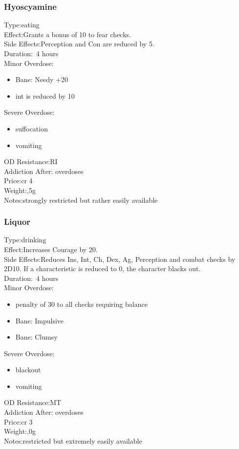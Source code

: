 \subsubsection{Hyoscyamine}
Type:\tab eating\\
Effect:\tab Grants a bonus of 10 to fear checks.\\
Side Effects:\tab Perception and Con are reduced by 5.\\
Duration:\tab ~4 hours\\
Minor Overdose:\\
\begin{itemize}
	\setlength\itemsep{-8mm}
	\vspace{-12mm}
	\item Bane: Needy +20
	\item int is reduced by 10
\end{itemize}
Severe Overdose:\\
\begin{itemize}
	\setlength\itemsep{-8mm}
	\vspace{-12mm}
	\item suffocation
	\item vomiting
\end{itemize}
OD Resistance:\tab RI\\
Addiction After: overdoses\\
Price:\tab cr 4\\
Weight:,5g\\
Notes:\tab strongly restricted but rather easily available


\subsubsection{Liquor}
Type:\tab drinking\\
Effect:\tab Increases Courage by 20.\\
Side Effects:\tab Reduces Ins, Int, Ch, Dex, Ag, Perception and combat checks by 2D10. If a characteristic is reduced to 0, the character blacks out.\\
Duration:\tab ~4 hours\\
Minor Overdose:\\
\begin{itemize}
	\setlength\itemsep{-8mm}
	\vspace{-12mm}
	\item penalty of 30 to all checks requiring balance
	\item Bane: Impulsive
	\item Bane: Clumsy
\end{itemize}
Severe Overdose:\\
\begin{itemize}
	\setlength\itemsep{-8mm}
	\vspace{-12mm}
	\item blackout
	\item vomiting
\end{itemize}
OD Resistance:\tab MT\\
Addiction After: overdoses\\
Price:\tab cr 3\\
Weight:,0g\\
Notes:\tab restricted but extremely easily available


